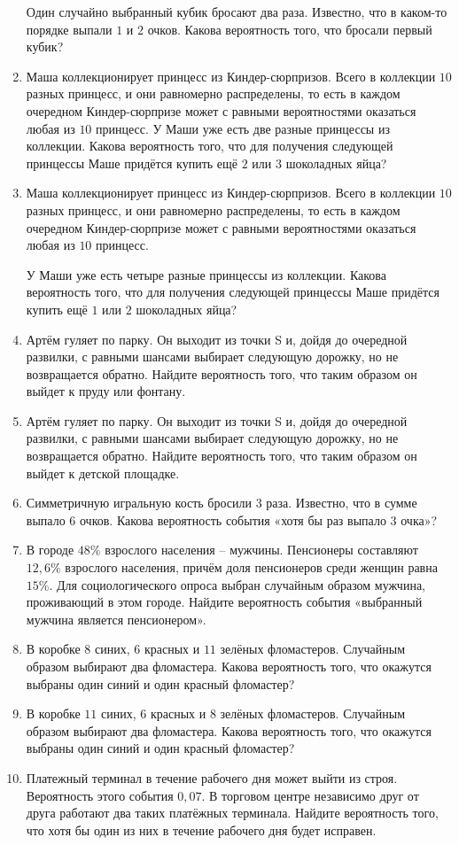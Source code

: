 \documentclass[12pt, a4paper]{article}
\begin{document}
\begin{enumerate}
		Один случайно выбранный кубик бросают два раза. Известно, что в каком-то порядке выпали \( 1 \) и \( 2 \) очков. Какова вероятность того, что бросали первый кубик?
		\item Маша коллекционирует принцесс из Киндер-сюрпризов. Всего в коллекции \( 10 \) разных принцесс, и они равномерно распределены, то есть в каждом очередном Киндер-сюрпризе может с равными вероятностями оказаться любая из \( 10 \) принцесс. У Маши уже есть две разные принцессы из коллекции. Какова вероятность того, что для получения следующей принцессы Маше придётся купить ещё \( 2 \) или \( 3 \) шоколадных яйца?
		\item Маша коллекционирует принцесс из Киндер-сюрпризов. Всего в коллекции \( 10 \) разных принцесс, и они равномерно распределены, то есть в каждом очередном Киндер-сюрпризе может с равными вероятностями оказаться любая из \( 10 \) принцесс.
		
		У Маши уже есть четыре разные принцессы из коллекции. Какова вероятность того, что для получения следующей принцессы Маше придётся купить ещё \( 1 \) или \( 2 \) шоколадных яйца?
		\item Артём гуляет по парку. Он выходит из точки S и, дойдя до очередной развилки, с равными шансами выбирает следующую дорожку, но не возвращается обратно. Найдите вероятность того, что таким образом он выйдет к пруду или фонтану.
		\item Артём гуляет по парку. Он выходит из точки S и, дойдя до очередной развилки, с равными шансами выбирает следующую дорожку, но не возвращается обратно. Найдите вероятность того, что таким образом он выйдет к детской площадке.
		\item Симметричную игральную кость бросили \( 3 \) раза. Известно, что в сумме выпало \( 6 \) очков. Какова вероятность события «хотя бы раз выпало \( 3 \) очка»?
		\item В городе \( 48\% \) взрослого населения – мужчины. Пенсионеры составляют \( 12,6\% \) взрослого населения, причём доля пенсионеров среди женщин равна \( 15\% \). Для социологического опроса выбран случайным образом мужчина, проживающий в этом городе. Найдите вероятность события «выбранный мужчина является пенсионером».
		\item В коробке \( 8 \) синих, \( 6 \) красных и \( 11 \) зелёных фломастеров. Случайным образом выбирают два фломастера. Какова вероятность того, что окажутся выбраны один синий и один красный фломастер?
		\item В коробке \( 11 \) синих, \( 6 \) красных и \( 8 \) зелёных фломастеров. Случайным образом выбирают два фломастера. Какова вероятность того, что окажутся выбраны один синий и один красный фломастер?
		\item Платежный терминал в течение рабочего дня может выйти из строя. Вероятность этого события \( 0,07 \). В торговом центре независимо друг от друга работают два таких платёжных терминала. Найдите вероятность того, что хотя бы один из них в течение рабочего дня будет исправен.
	\end{enumerate}	
	
\end{document}
